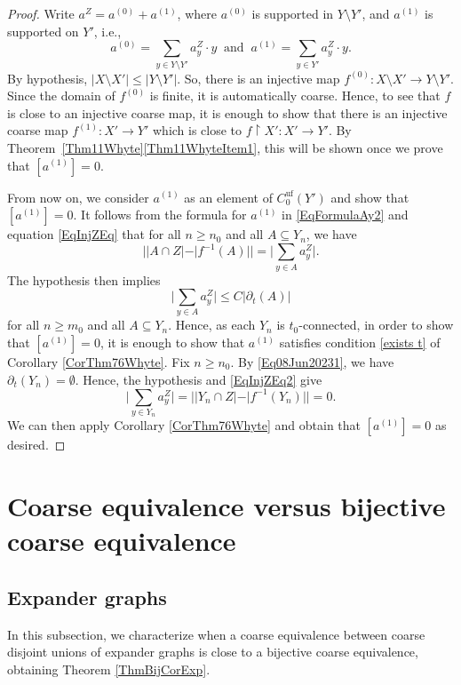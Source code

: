 \documentclass[11pt]{amsart}
\numberwithin{equation}{section}
\theoremstyle{definition}
\theoremstyle{remark}
\numberwithin{equation}{section}
\begin{document}
\begin{proof}
Write $a^Z=a^{(0)}+a^{(1)}$, where $a^{(0)}$ is supported in $Y\setminus Y'$, and $a^{(1)}$ is supported on $ Y'$, i.e., 
\begin{equation}\label{EqFormulaAy2}
a^{(0)}=\sum_{y\in Y\setminus Y'}a^Z_y\cdot y\ \text{ and } \ a^{(1)}=\sum_{y\in Y'}a_y^Z\cdot y.
\end{equation}
 By hypothesis, $|X\setminus X'|\leq |Y\setminus Y'|$. So, there is an injective map $f^{(0)}\colon X\setminus X' \to Y\setminus Y'$.  Since the domain of $f^{(0)}$ is finite, it is automatically coarse.  Hence, to see that $f$ is close to an injective coarse map, it is enough to show that there is an injective coarse map $f^{(1)}\colon X'\to Y'$ which is close to $f\restriction X'\colon X'\to Y'$. By Theorem~\ref{Thm11Whyte}\eqref{Thm11WhyteItem1}, this will be shown once we prove that $[a^{(1)}]=0$.

From now on, we consider $a^{(1)}$ as an element of $C_0^{\textrm{uf}}(Y')$ and show that $[a^{(1)}]=0$. It follows from the formula for $a^{(1)}$ in \eqref{EqFormulaAy2} and equation \eqref{EqInjZEq} that for all $n\geq n_0$ and all $A\subseteq Y_n$, we have
\begin{equation}\label{EqInjZEq2}
 ||A\cap Z|-|f^{-1}(A)||= \Bigg|\sum_{y\in A}a_y^Z\Bigg|.
\end{equation}
The hypothesis then implies
\[
\Bigg|\sum_{y\in A}a_y^Z\Bigg|\leq C|\partial_{t}(A)|
\]
for all $n\geq m_0$ and all $A\subseteq Y_n$. Hence, as each $Y_n$ is $t_0$-connected, in order to show that $[a^{(1)}]=0$, it is enough to show that $a^{(1)}$ satisfies condition \eqref{exists t}  of Corollary \ref{CorThm76Whyte}. Fix $n\geq n_0$. By \eqref{Eq08Jun20231}, we have $\partial_{t}(Y_n)=\emptyset$. Hence, the hypothesis and \eqref{EqInjZEq2} give 
\[\Bigg|\sum_{y\in Y_n}a^Z_y\Bigg|=||Y_n\cap Z|-|f^{-1}(Y_n)||=0.\]
We can then apply Corollary \ref{CorThm76Whyte} and obtain that $[a^{(1)}]=0$ as desired. 
 \end{proof}






\section{Coarse equivalence versus bijective coarse equivalence}\label{SectionMainResults}

\subsection{Expander graphs} In this subsection, we characterize when a coarse equivalence between coarse disjoint unions of expander graphs is close to a bijective coarse equivalence, obtaining Theorem \ref{ThmBijCorExp}. 
\end{document}
